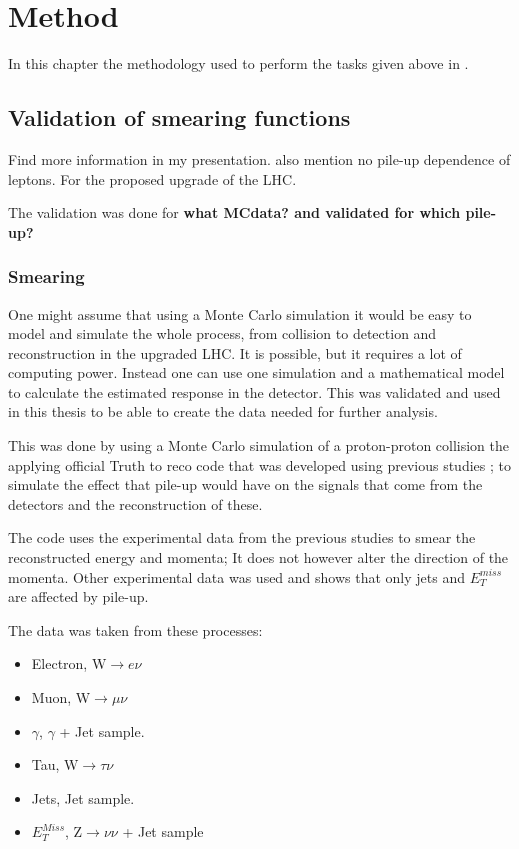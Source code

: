 \chapter{Method}\label{cha:meth}
In this chapter the methodology used to perform the tasks given above in .
\newpage
\section{Validation of smearing functions} 


Find more information in my presentation. also mention no pile-up dependence of leptons.
For the proposed upgrade of the LHC.

The validation was done for \textbf{what MCdata? and validated for which pile-up?}

\subsection{Smearing}
One might assume that using a Monte Carlo simulation it would be easy to model and simulate the whole process, from collision to detection and reconstruction in the upgraded LHC. It is possible, but it requires a lot of computing power. Instead one can use one simulation and a mathematical model to calculate the estimated response in the detector. This was validated and used in this thesis to be able to create the data needed for further analysis. 

This was done by using a Monte Carlo simulation of a proton-proton collision the applying official Truth to reco code that was developed using previous studies \citep{ATL-PHYS-PUB-2013-004}; to simulate the effect that pile-up would have on the signals that come from the detectors and the reconstruction of these.

The code uses the experimental data from the previous studies to smear the reconstructed energy and momenta; It does not however alter the direction of the momenta. Other experimental data was used and shows that only jets and $E^{miss}_T$ are affected by pile-up. 

The data was taken from these processes:
\begin{itemize}
\item Electron, W$\rightarrow e\nu$
\item Muon, W$\rightarrow \mu \nu$
\item $\gamma$, $\gamma$ + Jet sample.
\item Tau, W$\rightarrow \tau \nu$
\item Jets, Jet sample.
\item $E_T^{Miss}$, Z$\rightarrow \nu \nu$ + Jet sample
\end{itemize}

